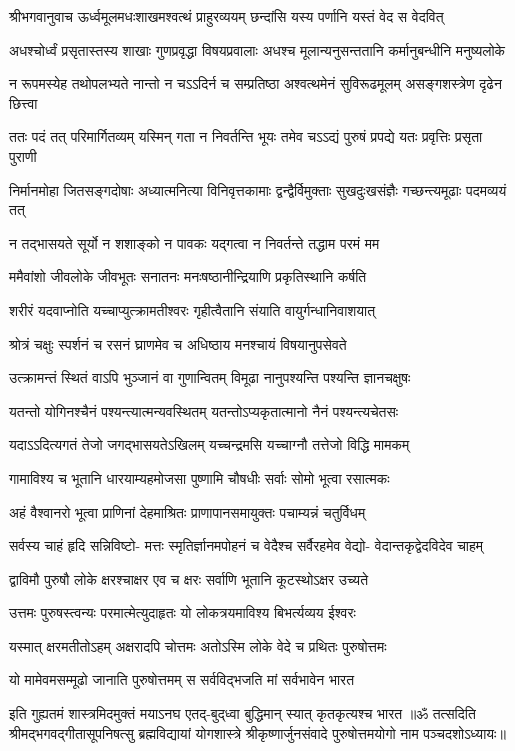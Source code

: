 {श्रीभगवानुवाच}
\twolineshloka
{ऊर्ध्वमूलमधःशाखमश्वत्थं प्राहुरव्ययम्}
{छन्दांसि यस्य पर्णानि यस्तं वेद स वेदवित्}%

\fourlineindentedshloka
{अधश्चोर्ध्वं प्रसृतास्तस्य शाखाः}
{गुणप्रवृद्धा विषयप्रवालाः}
{अधश्च मूलान्यनुसन्ततानि}
{कर्मानुबन्धीनि मनुष्यलोके}%

\fourlineindentedshloka
{न रूपमस्येह तथोपलभ्यते}
{नान्तो न चऽऽदिर्न च सम्प्रतिष्ठा}
{अश्वत्थमेनं सुविरूढमूलम्}
{असङ्गशस्त्रेण दृढेन छित्त्वा}%

\fourlineindentedshloka
{ततः पदं तत् परिमार्गितव्यम्}
{यस्मिन् गता न निवर्तन्ति भूयः}
{तमेव चऽऽद्यं पुरुषं प्रपद्ये}
{यतः प्रवृत्तिः प्रसृता पुराणी}%

\fourlineindentedshloka
{निर्मानमोहा जितसङ्गदोषाः}
{अध्यात्मनित्या विनिवृत्तकामाः}
{द्वन्द्वैर्विमुक्ताः सुखदुःखसंज्ञैः}
{गच्छन्त्यमूढाः पदमव्ययं तत्}%

\twolineshloka
{न तद्भासयते सूर्यो न शशाङ्को न पावकः}
{यद्गत्वा न निवर्तन्ते तद्धाम परमं मम}%

\twolineshloka
{ममैवांशो जीवलोके जीवभूतः सनातनः}
{मनःषष्ठानीन्द्रियाणि प्रकृतिस्थानि कर्षति}%

\twolineshloka
{शरीरं यदवाप्नोति यच्चाप्युत्क्रामतीश्वरः}
{गृहीत्वैतानि संयाति वायुर्गन्धानिवाशयात्}%

\twolineshloka
{श्रोत्रं चक्षुः स्पर्शनं च रसनं घ्राणमेव च}
{अधिष्ठाय मनश्चायं विषयानुपसेवते}%

\twolineshloka
{उत्क्रामन्तं स्थितं वाऽपि भुञ्जानं वा गुणान्वितम्}
{विमूढा नानुपश्यन्ति पश्यन्ति ज्ञानचक्षुषः}%

\twolineshloka
{यतन्तो योगिनश्चैनं पश्यन्त्यात्मन्यवस्थितम्}
{यतन्तोऽप्यकृतात्मानो नैनं पश्यन्त्यचेतसः}%

\twolineshloka
{यदाऽऽदित्यगतं तेजो जगद्भासयतेऽखिलम्}
{यच्चन्द्रमसि यच्चाग्नौ तत्तेजो विद्धि मामकम्}%

\twolineshloka
{गामाविश्य च भूतानि धारयाम्यहमोजसा}
{पुष्णामि चौषधीः सर्वाः सोमो भूत्वा रसात्मकः}%

\twolineshloka
{अहं वैश्वानरो भूत्वा प्राणिनां देहमाश्रितः}
{प्राणापानसमायुक्तः पचाम्यन्नं चतुर्विधम्}%

\fourlineindentedshloka
{सर्वस्य चाहं हृदि सन्निविष्टो-}
{मत्तः स्मृतिर्ज्ञानमपोहनं च}
{वेदैश्च सर्वैरहमेव वेद्यो-}
{वेदान्तकृद्वेदविदेव चाहम्}%

\twolineshloka
{द्वाविमौ पुरुषौ लोके क्षरश्चाक्षर एव च}
{क्षरः सर्वाणि भूतानि कूटस्थोऽक्षर उच्यते}%

\twolineshloka
{उत्तमः पुरुषस्त्वन्यः परमात्मेत्युदाहृतः}
{यो लोकत्रयमाविश्य बिभर्त्यव्यय ईश्वरः}%

\twolineshloka
{यस्मात् क्षरमतीतोऽहम् अक्षरादपि चोत्तमः}
{अतोऽस्मि लोके वेदे च प्रथितः पुरुषोत्तमः}%

\twolineshloka
{यो मामेवमसम्मूढो जानाति पुरुषोत्तमम्}
{स सर्वविद्भजति मां सर्वभावेन भारत}%

\twolineshloka
{इति गुह्यतमं शास्त्रमिदमुक्तं मयाऽनघ}
{एतद्-बुद्‌ध्वा बुद्धिमान् स्यात् कृतकृत्यश्च भारत}%
{॥ॐ तत्सदिति श्रीमद्भगवद्गीतासूपनिषत्सु ब्रह्मविद्यायां योगशास्त्रे श्रीकृष्णार्जुनसंवादे पुरुषोत्तमयोगो नाम पञ्चदशोऽध्यायः॥}